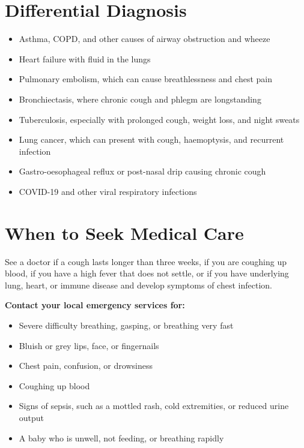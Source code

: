 \section*{Differential Diagnosis}
\begin{itemize}
    \item Asthma, COPD, and other causes of airway obstruction and wheeze
    \item Heart failure with fluid in the lungs
    \item Pulmonary embolism, which can cause breathlessness and chest pain
    \item Bronchiectasis, where chronic cough and phlegm are longstanding
    \item Tuberculosis, especially with prolonged cough, weight loss, and night sweats
    \item Lung cancer, which can present with cough, haemoptysis, and recurrent infection
    \item Gastro-oesophageal reflux or post-nasal drip causing chronic cough
    \item COVID-19 and other viral respiratory infections
\end{itemize}

\section*{When to Seek Medical Care}
See a doctor if a cough lasts longer than three weeks, if you are coughing up blood, if you have a high fever that does not settle, or if you have underlying lung, heart, or immune disease and develop symptoms of chest infection.

\medskip
\textbf{Contact your local emergency services for:}
\begin{itemize}
    \item Severe difficulty breathing, gasping, or breathing very fast
    \item Bluish or grey lips, face, or fingernails
    \item Chest pain, confusion, or drowsiness
    \item Coughing up blood
    \item Signs of sepsis, such as a mottled rash, cold extremities, or reduced urine output
    \item A baby who is unwell, not feeding, or breathing rapidly
\end{itemize}

